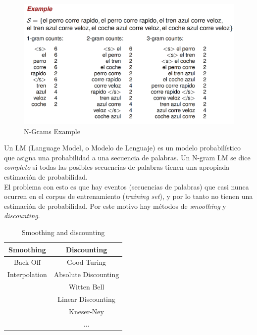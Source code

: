 \begin{figure}[htbp]
   \centering
   \includegraphics{images/07/ngramExample.png}
   \caption{N-Grams Example}
   \label{fig:07/ngramExample}
\end{figure}

Un LM (Language Model, o Modelo de Lenguaje) es un modelo probabilístico que asigna una probabilidad a una secuencia de palabras.
Un N-gram LM se dice \textit{completo} si todas las posibles secuencias de palabras tienen una apropiada estimación de probabilidad.\\
El problema con esto es que hay eventos (secuencias de palabras) que casi nunca ocurren en el corpus de entrenamiento (\textit{training set}), y por lo tanto no tienen una estimación de probabilidad.
Por este motivo hay métodos de \textit{smoothing} y \textit{discounting}.

\begin{table}[htbp]
   \centering
   \begin{tabular}{|c|c|}
      \hline
      \textbf{Smoothing} & \textbf{Discounting}\\
      \hline
      Back-Off & Good Turing\\
      Interpolation & Absolute Discounting\\
      & Witten Bell\\
      & Linear Discounting\\
      & Kneser-Ney\\
      & ...\\
      \hline
   \end{tabular}
   \caption{Smoothing and discounting}
   \label{tab:smoothingAndDiscounting}
\end{table}


